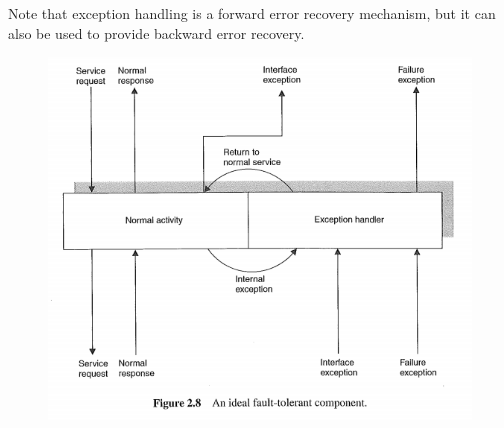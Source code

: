 Note that exception handling is a forward error recovery mechanism, but it can also be used to provide backward error recovery.

\begin{figure}[H]
\centering
\includegraphics[width=\textwidth]{figures/Fault_Tolerance/ideal-fault-tolerant-component.PNG}
\end{figure}




